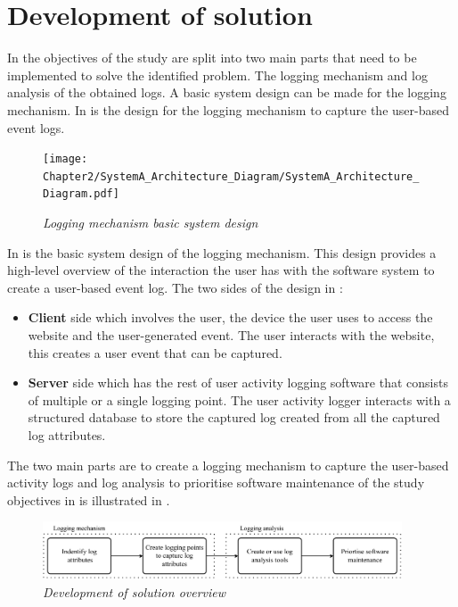  \clearpage

\section{Development of solution}\label{sec:ch2_developementOfSolution}
In  the objectives of the study are split into two main parts that need to be implemented to solve the identified problem. The logging mechanism and log analysis of the obtained logs. A basic system design can be made for the logging mechanism. In  is the design for the logging mechanism to capture the user-based event logs.

\begin{figure}[!htb] %
	\centering %
	\texttt{[image: Chapter2/SystemA\_Architecture\_Diagram/SystemA\_Architecture\_Diagram.pdf]}
	\caption[Logging mechanism basic system design]
	{\textit{Logging mechanism basic system design}}\label{fig:ch2_systemDesign}
\end{figure}

In  is the basic system design of the logging mechanism. This design provides a high-level overview of the interaction the user has with the software system to create a user-based event log. The two sides of the design in :

\begin{itemize}
	\item \textbf{Client} side which involves the user, the device the user uses to access the website and the user-generated event. The user interacts with the website, this creates a user event that can be captured. 
	\item \textbf{Server} side which has the rest of user activity logging software that consists of multiple or a single logging point. The user activity logger interacts with a structured database to store the captured log created from all the captured log attributes.
\end{itemize}

The two main parts are to create a logging mechanism to capture the user-based activity logs and log analysis to prioritise software maintenance of the study objectives in  is illustrated in .

\clearpage

\begin{figure}[!htb] %
	\centering %
	\includegraphics[width=0.95\textwidth]{img/Chapter2/developmentOfSolution/developementOfSolution.pdf}
	\caption[Development of solution overview]
	{\textit{Development of solution overview}}\label{fig:ch2_developmentOfSolution}
\end{figure}

